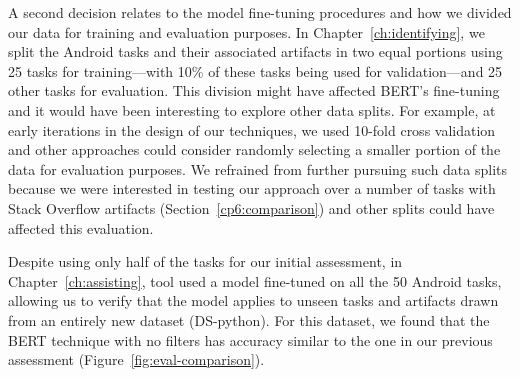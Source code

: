 A second decision relates to the model fine-tuning procedures and how we
divided our data for training and evaluation purposes. 
In Chapter~\ref{ch:identifying}, 
we split the Android tasks and their associated artifacts in two equal portions using 
25 tasks for training---with 10\% of these tasks being used for validation---and 
25 other tasks for evaluation.
This division might have affected BERT's fine-tuning and it would have been interesting 
to explore other data splits. 
For example, at early iterations in the design of our techniques, 
we used 10-fold cross validation~\cite{stone1974cross} 
and other approaches could consider randomly selecting a smaller portion of 
the data for evaluation purposes. 
We refrained from further pursuing such data splits 
because we were interested in testing our approach over 
a number of tasks with Stack Overflow artifacts (Section~\ref{cp6:comparison}) and other splits 
could have affected this evaluation. 


Despite using only half of the tasks for our initial assessment, in Chapter~\ref{ch:assisting},
\acs{tool} used a model fine-tuned on all the 50 Android tasks,
 allowing us to verify that the model applies to unseen tasks and artifacts 
 drawn from an entirely new dataset (\acs{DS-python}).
 For this dataset, we found that the BERT technique with no filters has 
 accuracy similar to the one in our previous assessment (Figure~\ref{fig:eval-comparison}).









